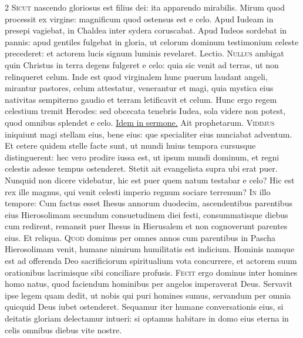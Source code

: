 \begin{multicols*}{2}
\lettrine[lines=2]{\zallmancaps \color{Red} S}{icut} nascendo gloriosus est filius dei: ita apparendo mirabilis. Mirum quod processit ex virgine: magnificum quod ostensus est e celo. Apud Iudeam in presepi vagiebat, in Chaldea inter sydera coruscabat. Apud Iudeos sordebat in pannis: apud gentiles fulgebat in gloria, ut celorum dominum testimonium celeste precederet: et actorem lucis signum luminis revelaret.
{\color{Red} Lectio.}
\lettrine[lines=2]{\zallmancaps \color{Blue} N}{ullus} ambigat quin Christus in terra degens fulgeret e celo: quia sic venit ad terras, ut non relinqueret celum. Inde est quod virginalem hunc puerum laudant angeli, mirantur pastores, celum attestatur, venerantur et magi, quia mystica eius nativitas sempiterno gaudio et terram letificavit et celum. Hunc ergo regem celestium tremit Herodes: sed obcecata tenebris Iudea, sola videre non potest, quod omnibus splendet e celo.
\newline \ul{Idem in sermone.} Ait prophetarum. 
\lettrine[lines=2]{\zallmancaps \color{Red} V}{idimus} iniquiunt magi stellam eius, bene eius: que specialiter eius nunciabat adventum. Et cetere quidem stelle facte sunt, ut mundi huius tempora cursusque distinguerent: hec vero prodire iussa est, ut ipsum mundi dominum, et regni celestis adesse tempus ostenderet. Stetit ait evangelista supra ubi erat puer. Nunquid non dicere videbatur, hic est puer quem natum testabar e celo? Hic est rex ille magnus, qui venit celesti imperio regnum sociare terrenum?
\lettrine[lines=2]{\zallmancaps \color{Blue} I}{n} illo tempore: Cum factus esset Ihesus annorum duodecim, ascendentibus parentibus eius Hierosolimam secundum consuetudinem diei festi, consummatisque diebus cum redirent, remansit puer Ihesus in Hierusalem et non cognoverunt parentes eius. Et reliqua.
 \grecross
\lettrine[lines=2]{\zallmancaps \color{Red} Q}{uod} dominus per omnes annos cum parentibus in Pascha Hierosolimam venit, humane nimirum humilitatis est indicium. Hominis namque est ad offerenda Deo sacrificiorum spiritualium vota concurrere, et actorem suum orationibus lacrimisque sibi conciliare profusis.
\lettrine[lines=2]{\zallmancaps \color{Blue} F}{ecit} ergo dominus inter homines homo natus, quod faciendum hominibus per angelos imperaverat Deus. Servavit ipse legem quam dedit, ut nobis qui puri homines sumus, servandum per omnia quicquid Deus iubet ostenderet. Sequamur iter humane conversationis eius, si deitatis gloriam delectamur intueri: si optamus habitare in domo eius eterna in celis omnibus diebus vite nostre.

\end{multicols*}
